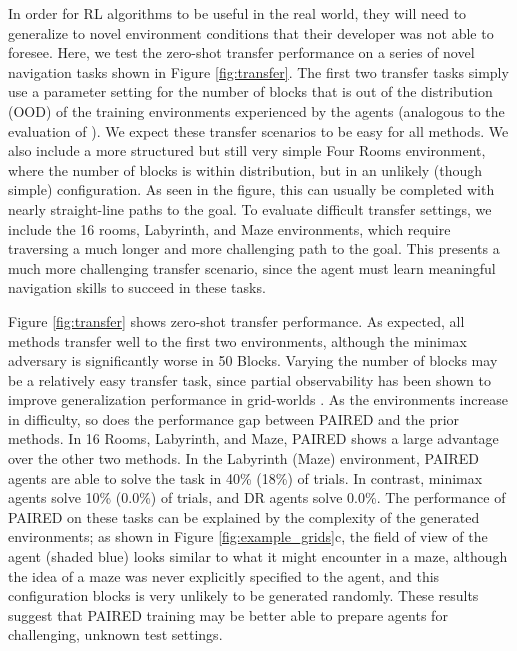 \documentclass{article}
\begin{document}
In order for RL algorithms to be useful in the real world, they will need to generalize to novel environment conditions that their developer was not able to foresee. 
Here, we test the zero-shot transfer performance on a series of novel navigation tasks shown in Figure \ref{fig:transfer}. The first two transfer tasks simply use a parameter setting for the number of blocks that is out of the distribution (OOD) of the training environments experienced by the agents (analogous to the evaluation of \citep{pinto2017supervision}). We expect these transfer scenarios to be easy for all methods. We also include a more structured but still very simple Four Rooms environment, where the number of blocks is within distribution, but in an unlikely (though simple) configuration. As seen in the figure, this can usually be completed with nearly straight-line paths to the goal. To evaluate difficult transfer settings, we include the 16 rooms, Labyrinth, and Maze environments, which require traversing a much longer and more challenging path to the goal. This presents a much more challenging transfer scenario, since the agent must learn meaningful navigation skills to succeed in these tasks.

Figure \ref{fig:transfer} shows zero-shot transfer performance. As expected, all methods transfer well to the first two environments, although the minimax adversary is significantly worse in 50 Blocks. Varying the number of blocks may be a relatively easy transfer task, since partial observability has been shown to improve generalization performance in grid-worlds \cite{ye2020rotation}. As the environments increase in difficulty, so does the performance gap between PAIRED and the prior methods. In 16 Rooms, Labyrinth, and Maze, PAIRED shows a large advantage over the other two methods. In the Labyrinth (Maze) environment, PAIRED agents are able to solve the task in 40\% (18\%) of trials. In contrast, minimax agents solve 10\% (0.0\%) of trials, and DR agents solve 0.0\%. The performance of PAIRED on these tasks can be explained by the complexity of the generated environments; as shown in Figure \ref{fig:example_grids}c, the field of view of the agent (shaded blue) looks similar to what it might encounter in a maze, although the idea of a maze was never explicitly specified to the agent, and this configuration blocks is very unlikely to be generated randomly. These results suggest that PAIRED training may be better able to prepare agents for challenging, unknown test settings.
\end{document}
